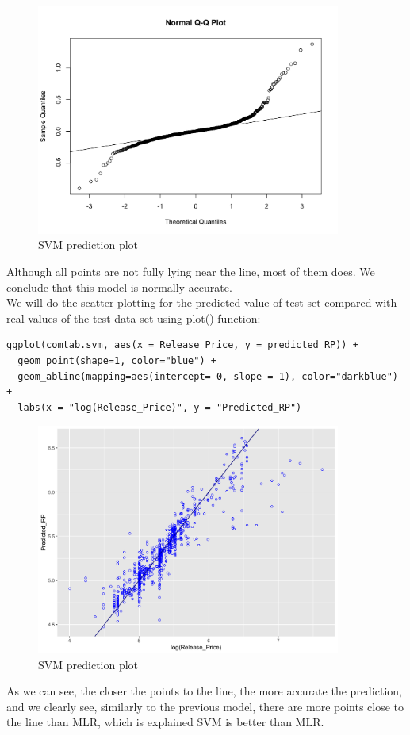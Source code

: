 \documentclass[a4paper]{article}
\theoremstyle{definition}
\begin{document}
\begin{figure}[h!]
\begin{center}
\includegraphics[width=10cm]{images/qqsvm.png}
\end{center}
\caption{SVM prediction plot}
\end{figure}
Although all points are not fully lying near the line, most of them does. We conclude that this model is normally accurate.\\
We will do the scatter plotting for the predicted value of test set compared with real values of the test data set using plot() function:
\begin{mdframed}[leftline=false,rightline=false,backgroundcolor=lightblue!10,nobreak=false,numbers=false]
    \begin{verbatim}
ggplot(comtab.svm, aes(x = Release_Price, y = predicted_RP)) +
  geom_point(shape=1, color="blue") +
  geom_abline(mapping=aes(intercept= 0, slope = 1), color="darkblue") +
  labs(x = "log(Release_Price)", y = "Predicted_RP")
\end{verbatim}
\end{mdframed}
\begin{figure}[h!]
\begin{center}
\includegraphics[width=10cm]{images/svm.png}
\end{center}
\caption{SVM prediction plot}
\end{figure}
As we can see, the closer the points to the line, the more accurate the prediction, and we clearly see, similarly to the previous model, there are more points close to the line than MLR, which is explained SVM is better than MLR.
\end{document}

